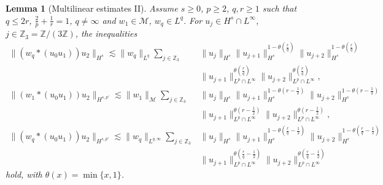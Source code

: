 \documentclass[12pt]{article}
\theoremstyle{plain}
\newtheorem{lemma}[theo]{Lemma}
\newcommand{\meas}{\mathcal{M}}
\begin{document}
\begin{lemma}[Multilinear estimates II]\label{lem:bounds-forcing-short-range}
Assume  $s\geq0$, $p\geq2$, $q,r\geq1$ such that $q\leq2r$, $\frac{2}{p}+\frac{1}{r}=1$, $q\neq\infty$
and $w_{1}\in\meas$, $w_{q}\in L^{q}$. For $u_j\in H^s\cap L^\infty$, $j\in  \mathbb{Z}_3 = \mathbb{Z}/(3\mathbb{Z})$, the inequalities
\begin{align}
\|(w_{q}*(u_{0}u_{1}))u_{2}\|_{H^{s}}  \lesssim\|w_{q}\|_{L^{q}}\sum_{j\in\mathbb{Z}_{3}} &\|u_{j}\|_{H^{s}}\|u_{j+1}\|_{H^s}^{1-\theta(\frac{r}{q})}\|u_{j+2}\|_{H^s}^{1-\theta(\frac{r}{q})} \nonumber\\
&\|u_{j+1}\|_{L^{p}\cap L^{\infty}}^{\theta(\frac{r}{q})}\|u_{j+2}\|_{L^{p}\cap L^{\infty}}^{\theta(\frac{r}{q})} , \label{eq:convolution-Hartree-Hs-Lq-theta}\\
\|(w_{1}*(u_{0}u_{1}))u_{2}\|_{H^{s,p'}}  \lesssim\|w_{1}\|_{\meas}\sum_{j\in\mathbb{Z}_{3}}&\|u_{j}\|_{H^{s}}\|u_{j+1}\|_{H^{s}}^{1-\theta(r-\frac{1}{2})} \|u_{j+2}\|_{H^{s}}^{1-\theta(r-\frac{1}{2})}\nonumber\\
&\|u_{j+1}\|_{L^{p}\cap L^{\infty}}^{\theta(r-\frac{1}{2})}\|u_{j+2}\|_{L^{p}\cap L^{\infty}}^{\theta(r-\frac{1}{2})}, \label{eq:convolution-Hartree-Hspprime-M1-theta}\\
\|(w_{q}*(u_{0}u_{1}))u_{2}\|_{H^{s,p'}}  \lesssim\|w_{q}\|_{L^{q,\infty}}\sum_{j\in\mathbb{Z}_{3}}&\|u_{j}\|_{H^{s}}\|u_{j+1}\|_{H^{s}}^{1-\theta(\frac{r}{q}-\frac{1}{2})} \|u_{j+2}\|_{H^{s}}^{1-\theta(\frac{r}{q}-\frac{1}{2})}\nonumber\\
&\|u_{j+1}\|_{L^{p}\cap L^{\infty}}^{\theta(\frac{r}{q}-\frac{1}{2})}\|u_{j+2}\|_{L^{p}\cap L^{\infty}}^{\theta(\frac{r}{q}-\frac{1}{2})}\label{eq:convolution-Hartree-Hspprime-Lq-theta}
\end{align}
hold, with $\theta(x)=\min\{x,1\}$.
\end{lemma}
\end{document}
